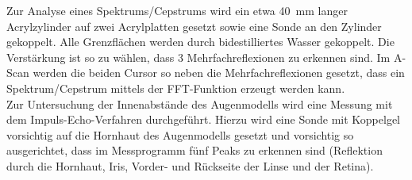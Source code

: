 Zur Analyse eines Spektrums/Cepstrums wird ein etwa \SI{40}{\milli\meter} langer Acrylzylinder auf zwei Acrylplatten gesetzt sowie eine Sonde an den Zylinder gekoppelt.
Alle Grenzflächen werden durch bidestilliertes Wasser gekoppelt. Die Verstärkung ist so zu wählen, dass 3 Mehrfachreflexionen zu erkennen sind.
Im A-Scan werden die beiden Cursor so neben die Mehrfachreflexionen gesetzt, dass ein Spektrum/Cepstrum mittels der FFT-Funktion erzeugt werden kann.\\
Zur Untersuchung der Innenabstände des Augenmodells wird eine Messung mit dem Impuls-Echo-Verfahren durchgeführt. Hierzu wird eine Sonde mit Koppelgel vorsichtig auf die Hornhaut des Augenmodells gesetzt und vorsichtig so ausgerichtet, dass im Messprogramm fünf Peaks zu erkennen sind (Reflektion durch die Hornhaut, Iris, Vorder- und Rückseite der Linse und der Retina).
